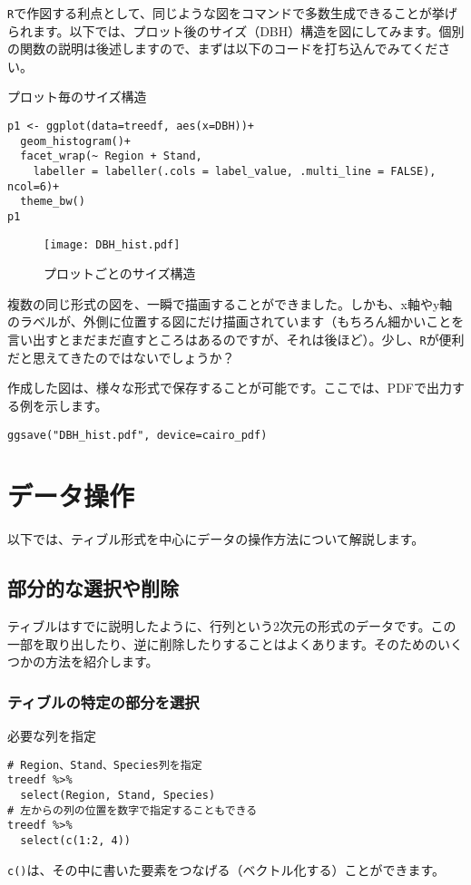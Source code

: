 \texttt{R}で作図する利点として、同じような図をコマンドで多数生成できることが挙げられます。以下では、プロット後のサイズ（DBH）構造を図にしてみます。個別の関数の説明は後述しますので、まずは以下のコードを打ち込んでみてください。

\begin{itembox}[l]{プロット毎のサイズ構造}
\begin{verbatim}
p1 <- ggplot(data=treedf, aes(x=DBH))+
  geom_histogram()+
  facet_wrap(~ Region + Stand,
    labeller = labeller(.cols = label_value, .multi_line = FALSE), ncol=6)+
  theme_bw()
p1
\end{verbatim}
\end{itembox}
\begin{figure}[htb]
\begin{center}
\graphicspath{{1_basic/figs/}}
\texttt{[image: DBH\_hist.pdf]}\\
\caption{プロットごとのサイズ構造}
 \label{plot_size}
\end{center}
\end{figure}

複数の同じ形式の図を、一瞬で描画することができました。しかも、x軸やy軸のラベルが、外側に位置する図にだけ描画されています（もちろん細かいことを言い出すとまだまだ直すところはあるのですが、それは後ほど）。少し、\texttt{R}が便利だと思えてきたのではないでしょうか？

作成した図は、様々な形式で保存することが可能です。ここでは、PDFで出力する例を示します。
\begin{verbatim}
ggsave("DBH_hist.pdf", device=cairo_pdf)
\end{verbatim}

\clearpage
\section{データ操作}
以下では、ティブル形式を中心にデータの操作方法について解説します。

  \subsection{部分的な選択や削除}
ティブルはすでに説明したように、行列という2次元の形式のデータです。この一部を取り出したり、逆に削除したりすることはよくあります。そのためのいくつかの方法を紹介します。
    \subsubsection{ティブルの特定の部分を選択}
\begin{itembox}[l]{必要な列を指定}
\begin{verbatim}
# Region、Stand、Species列を指定
treedf %>%
  select(Region, Stand, Species)
# 左からの列の位置を数字で指定することもできる
treedf %>%
  select(c(1:2, 4))
\end{verbatim}
\end{itembox}
\verb|c()|は、その中に書いた要素をつなげる（ベクトル化する）ことができます。

